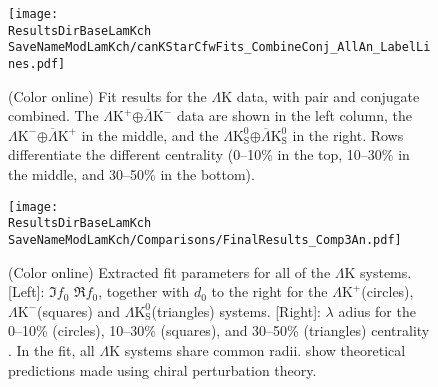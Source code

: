 \documentclass[ALICE,manyauthors]{cernphprep}
\newcommand{\ResultsDirBaseLamKch}{/home/jesse/Analysis/FemtoAnalysis/Results/Results_cLamcKch_20190319/}
\newcommand{\ResultsDirBaseLamKs}{/home/jesse/Analysis/FemtoAnalysis/Results/Results_cLamK0_20190319/}
\newcommand{\MomRes}{_MomResCrctn}%
\newcommand{\NonFlatBgdLamKch}{_NonFlatBgdCrctnLamK0LamKchPolynomial}
\newcommand{\NonFlatBgdLamKs}{_NonFlatBgdCrctnLamK0LamKchPolynomial}
\newcommand{\ResNum}{_3Res}
\newcommand{\PrimMaxDecay}{_PrimMaxDecay10fm}
\newcommand{\ResMethod}{_UsingXiDataAndCoulombOnly}
\newcommand{\ParamFixAndShareLamKch}{_ShareLam_Dualie_ShareLam_ShareRadii}
\newcommand{\ParamFixAndShareLamKs}{_ShareLam_Dualie_ShareLam_ShareRadii}
\newcommand{\SaveNameModLamKch}{\MomRes\NonFlatBgdLamKch\ResNum\PrimMaxDecay\ResMethod\ParamFixAndShareLamKch}
\newcommand{\SaveNameModLamKs}{\MomRes\NonFlatBgdLamKs\ResNum\PrimMaxDecay\ResMethod\ParamFixAndShareLamKs}
\newcommand{\LamK}{$\Lambda$K\xspace}
\newcommand{\LamKchP}{$\Lambda\mathrm{K^{+}}$\xspace}
\newcommand{\ALamKchM}{$\overline{\Lambda}\mathrm{K^{-}}$\xspace}
\newcommand{\LamKchM}{$\Lambda\mathrm{K^{-}}$\xspace}
\newcommand{\ALamKchP}{$\overline{\Lambda}\mathrm{K^{+}}$\xspace}
\newcommand{\LamKs}{$\Lambda\mathrm{K^{0}_{S}}$\xspace}
\newcommand{\ALamKs}{$\overline{\Lambda}\mathrm{K^{0}_{S}}$\xspace}
\begin{document}
\begin{figure}[h!]
  \centering
  \texttt{[image: \\ResultsDirBaseLamKch\\SaveNameModLamKch/canKStarCfwFits\_CombineConj\_AllAn\_LabelLines.pdf]}
  \caption[\LamK data with fits]
  {
  (Color online) Fit results for the \LamK data, with pair and conjugate combined.
  The \LamKchP$\oplus$\ALamKchM data are shown in the left column, the \LamKchM$\oplus$\ALamKchP in the middle, and the \LamKs$\oplus$\ALamKs in the right. 
  Rows differentiate the different centrality {\color{red}{bins}} {\color{blue}{intervals}} (0--10\% in the top, 10--30\% in the middle, and 30--50\% in the bottom).
  {\color{red}{See text for further details.}}
  {\color{blue}{
  Lines represent statistical uncertainties, while boxes represent systematic uncertainties.
  The dotted curve shows the primary (\LamK) contribution to the fit, the dashed curve shows the fit to the non-femtoscopic background, and the solid curve shows the final fit.
  }}
 }
  \label{fig:LamKFits_3Res}
\end{figure}

\begin{figure}[h]
  \centering
  \texttt{[image: \\ResultsDirBaseLamKch\\SaveNameModLamKch/Comparisons/FinalResults\_Comp3An.pdf]}
  \caption[Extracted Scattering Parameters]
  {
  (Color online) Extracted fit parameters for all of the \LamK systems.  
  [Left]: $\Im f_{0}$ {\color{red}{vs.}} {\color{blue}{and}} $\Re f_{0}$, together with $d_{0}$ to the right for the \LamKchP (circles), \LamKchM (squares) and \LamKs (triangles) systems.  
  [Right]: $\lambda$ {\color{red}{vs.}} {\color{blue}{and}} {\color{red}{R}}{\color{blue}{r}}adius {\color{blue}{parameters}} for the 0--10\% (circles), 10--30\% (squares), and 30--50\% (triangles) centrality {\color{red}{bins}} {\color{blue}{intervals}}.  
  In the fit, all \LamK systems share common radii.
  {} {} show theoretical predictions made using chiral perturbation theory.
  }
  \label{fig:ScattParams_3Res}
\end{figure}
\end{document}
